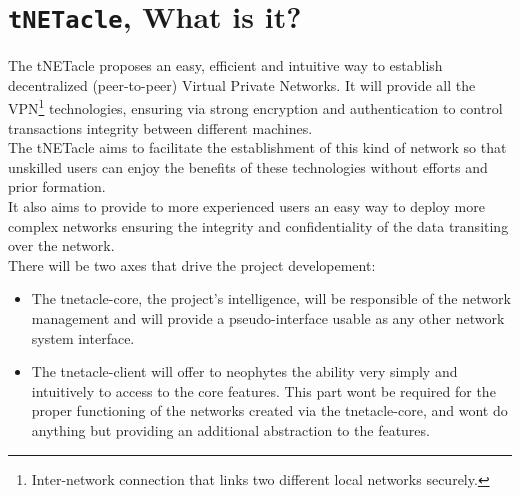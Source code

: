 \section{\texttt{tNETacle}, What is it?}
The tNETacle proposes an easy, efficient and intuitive way to establish
decentralized (peer-to-peer) Virtual Private Networks. It will provide all the
VPN\footnote{Inter-network connection that links two different local networks
securely.} technologies, ensuring via strong encryption and authentication to
control transactions integrity between different machines.\\

The tNETacle aims to facilitate the establishment of this kind of network so
that unskilled users can enjoy the benefits of these technologies without efforts and
prior formation.\\

It also aims to provide to more experienced users an easy way to
deploy more complex networks ensuring the integrity and confidentiality of the
data transiting over the network.\\

There will be two axes that drive the project developement:
\begin{itemize}
\item The tnetacle-core, the project's intelligence, will be responsible of the
network management and will provide a pseudo-interface usable as any other
network system interface.
\item The tnetacle-client will offer to neophytes the ability very simply and
intuitively to access to the core features. This part wont be required for the
proper functioning of the networks created via the tnetacle-core, and wont do
anything but providing an additional abstraction to the features.
\end{itemize}
